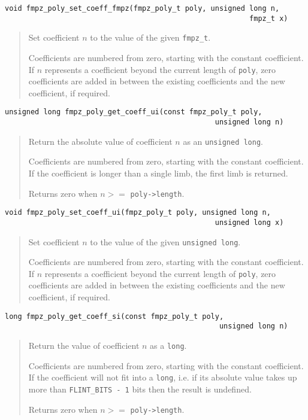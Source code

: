 \documentclass[a4paper,10pt]{article}
\newcommand{\code}{\lstinline}
\begin{document}
\begin{lstlisting}
void fmpz_poly_set_coeff_fmpz(fmpz_poly_t poly, unsigned long n, 
                                                         fmpz_t x) 
\end{lstlisting}
\begin{quote}
Set coefficient $n$ to the value of the given \code{fmpz_t}. 

Coefficients are numbered from zero, starting with the constant coefficient. If $n$ represents a coefficient beyond the current length of \code{poly}, zero coefficients are added in between the existing coefficients and the new coefficient, if required.
\end{quote}

\begin{lstlisting}
unsigned long fmpz_poly_get_coeff_ui(const fmpz_poly_t poly, 
                                                 unsigned long n)
\end{lstlisting}
\begin{quote}
Return the absolute value of coefficient $n$ as an \code{unsigned long}.

Coefficients are numbered from zero, starting with the constant coefficient. If the coefficient is longer than a single limb, the first limb is returned.

Returns zero when $n >= $ \code{poly->length}. 
\end{quote}

\begin{lstlisting}
void fmpz_poly_set_coeff_ui(fmpz_poly_t poly, unsigned long n, 
                                                 unsigned long x) 
\end{lstlisting}
\begin{quote}
Set coefficient $n$ to the value of the given \code{unsigned long}. 

Coefficients are numbered from zero, starting with the constant coefficient. If $n$ represents a coefficient beyond the current length of \code{poly}, zero coefficients are added in between the existing coefficients and the new coefficient, if required.
\end{quote}

\begin{lstlisting}
long fmpz_poly_get_coeff_si(const fmpz_poly_t poly, 
                                                  unsigned long n)
\end{lstlisting}
\begin{quote}
Return the value of coefficient $n$ as a \code{long}.

Coefficients are numbered from zero, starting with the constant coefficient. If the coefficient will not fit into a \code{long}, i.e. if its absolute value takes up more than \code{FLINT_BITS - 1} bits then the result is undefined.

Returns zero when $n >= $ \code{poly->length}. 
\end{quote}
\end{document}
